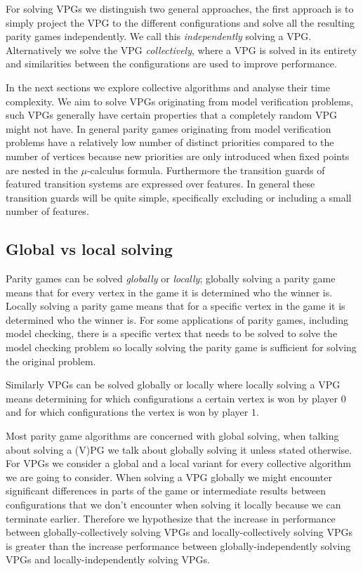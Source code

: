 For solving VPGs we distinguish two general approaches, the first approach is to simply project the VPG to the different configurations and solve all the resulting parity games independently. We call this \textit{independently} solving a VPG. Alternatively we solve the VPG \textit{collectively}, where a VPG is solved in its entirety and similarities between the configurations are used to improve performance. 

In the next sections we explore collective algorithms and analyse their time complexity. We aim to solve VPGs originating from model verification problems, such VPGs generally have certain properties that a completely random VPG might not have. In general parity games originating from model verification problems have a relatively low number of distinct priorities compared to the number of vertices because new priorities are only introduced when fixed points are nested in the $\mu$-calculus formula. Furthermore the transition guards of featured transition systems are expressed over features. In general these transition guards will be quite simple, specifically excluding or including a small number of features.

\subsection{Global vs local solving}
Parity games can be solved \textit{globally} or \textit{locally}; globally solving a parity game means that for every vertex in the game it is determined who the winner is. Locally solving a parity game means that for a specific vertex in the game it is determined who the winner is. For some applications of parity games, including model checking, there is a specific vertex that needs to be solved to solve the model checking problem so locally solving the parity game is sufficient for solving the original problem.

Similarly VPGs can be solved globally or locally where locally solving a VPG means determining for which configurations a certain vertex is won by player $0$ and for which configurations the vertex is won by player $1$.

Most parity game algorithms are concerned with global solving, when talking about solving a (V)PG we talk about globally solving it unless stated otherwise. For VPGs we consider a global and a local variant for every collective algorithm we are going to consider. When solving a VPG globally we might encounter significant differences in parts of the game or intermediate results between configurations that we don't encounter when solving it locally because we can terminate earlier. Therefore we hypothesize that the increase in performance between globally-collectively solving VPGs and locally-collectively solving VPGs is greater than the increase performance between globally-independently solving VPGs and locally-independently solving VPGs.